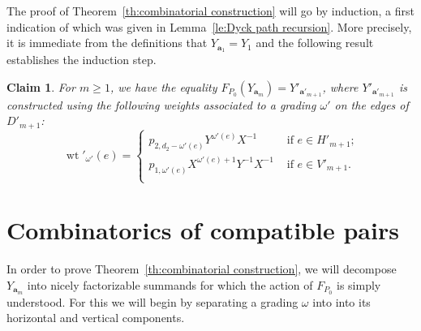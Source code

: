 \documentclass{amsart}
\newtheorem{claim}[theorem]{Claim}
\newcommand{\bfa}{\mathbf{a}}
\newcommand{\wt}{\operatorname{wt}}
\begin{document}
The proof of Theorem~\ref{th:combinatorial construction} will go by induction, a first indication of which was given in Lemma~\ref{le:Dyck path recursion}.  More precisely, it is immediate from the definitions that $Y_{\bfa_1}=Y_1$ and the following result establishes the induction step.
\begin{claim}\label{cl:combinatorial recursion}
  For $m\ge1$, we have the equality $F_{P_0}(Y_{\bfa_m})=Y'_{\bfa'_{m+1}}$, where $Y'_{\bfa'_{m+1}}$ is constructed using the following weights associated to a grading $\omega'$ on the edges of $D'_{m+1}$:
  \begin{equation}\label{eq:edge weights}
    \wt'_{\omega'}(e)=\begin{cases}
                        p_{2,d_2-\omega'(e)}Y^{\omega'(e)}X^{-1} & \text{ if $e\in H'_{m+1}$;}\\
                        p_{1,\omega'(e)}X^{\omega'(e)+1}Y^{-1}X^{-1} & \text{ if $e\in V'_{m+1}$.}\\
                      \end{cases}
  \end{equation}
\end{claim}


\section{Combinatorics of compatible pairs} 

In order to prove Theorem~\ref{th:combinatorial construction}, we will decompose $Y_{\bfa_m}$ into nicely factorizable summands for which the action of $F_{P_0}$ is simply understood.  For this we will begin by separating a grading $\omega$ into into its horizontal and vertical components.
\end{document}

